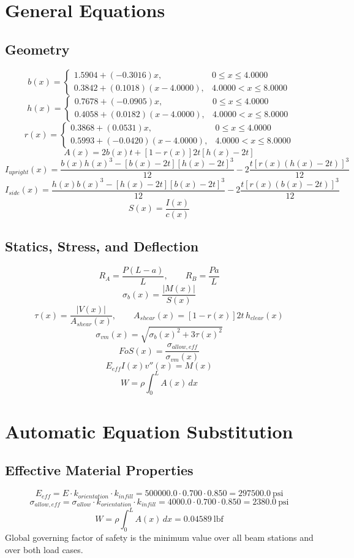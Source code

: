 \documentclass[11pt]{article}
\begin{document}
\section*{General Equations}
\subsection*{Geometry}
\[
b(x)=\begin{cases}1.5904 + (-0.3016)x, & 0 \le x \le 4.0000\\0.3842 + (0.1018)(x-4.0000), & 4.0000 < x \le 8.0000\end{cases}
\]
\[
h(x)=\begin{cases}0.7678 + (-0.0905)x, & 0 \le x \le 4.0000\\0.4058 + (0.0182)(x-4.0000), & 4.0000 < x \le 8.0000\end{cases}
\]
\[
r(x)=\begin{cases}0.3868 + (0.0531)x, & 0 \le x \le 4.0000\\0.5993 + (-0.0420)(x-4.0000), & 4.0000 < x \le 8.0000\end{cases}
\]
\[
A(x)=2b(x)t+[1-r(x)]2t[h(x)-2t]
\]
\[
I_{upright}(x)=\frac{b(x)h(x)^3-[b(x)-2t][h(x)-2t]^3}{12}-2\frac{t[r(x)(h(x)-2t)]^3}{12}
\]
\[
I_{side}(x)=\frac{h(x)b(x)^3-[h(x)-2t][b(x)-2t]^3}{12}-2\frac{t[r(x)(b(x)-2t)]^3}{12}
\]
\[
S(x)=\frac{I(x)}{c(x)}
\]

\subsection*{Statics, Stress, and Deflection}
\[
R_A=\frac{P(L-a)}{L}, \qquad R_B=\frac{Pa}{L}
\]
\[
\sigma_b(x)=\frac{|M(x)|}{S(x)}
\]
\[
\tau(x)=\frac{|V(x)|}{A_{shear}(x)}, \qquad A_{shear}(x)=[1-r(x)]2t\,h_{clear}(x)
\]
\[
\sigma_{vm}(x)=\sqrt{\sigma_b(x)^2+3\tau(x)^2}
\]
\[
FoS(x)=\frac{\sigma_{allow,eff}}{\sigma_{vm}(x)}
\]
\[
E_{eff}I(x)v''(x)=M(x)
\]
\[
W=\rho\int_0^L A(x)\,dx
\]

\section*{Automatic Equation Substitution}
\subsection*{Effective Material Properties}
\[E_{eff} = E \cdot k_{orientation} \cdot k_{infill} = 500000.0 \cdot 0.700 \cdot 0.850 = 297500.0\ \mathrm{psi}\]
\[\sigma_{allow,eff} = \sigma_{allow} \cdot k_{orientation} \cdot k_{infill} = 4000.0 \cdot 0.700 \cdot 0.850 = 2380.0\ \mathrm{psi}\]
\[W = \rho \int_0^L A(x)\,dx = 0.04589\ \mathrm{lbf}\]
Global governing factor of safety is the minimum value over all beam stations and over both load cases.
\end{document}
